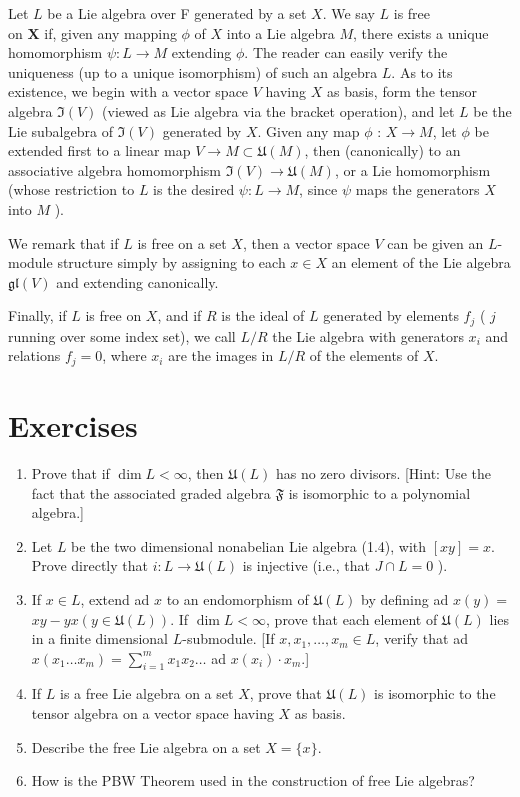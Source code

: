 \documentclass[10pt]{article}
\begin{document}
Let $L$ be a Lie algebra over F generated by a set $X$. We say $L$ is free\\
on $\mathbf{X}$ if, given any mapping $\phi$ of $X$ into a Lie algebra $M$, there exists a unique homomorphism $\psi: L \rightarrow M$ extending $\phi$. The reader can easily verify the uniqueness (up to a unique isomorphism) of such an algebra $L$. As to its existence, we begin with a vector space $V$ having $X$ as basis, form the tensor algebra $\mathfrak{I}(V)$ (viewed as Lie algebra via the bracket operation), and let $L$ be the Lie subalgebra of $\mathfrak{I}(V)$ generated by $X$. Given any map $\phi$ : $X \rightarrow M$, let $\phi$ be extended first to a linear map $V \rightarrow M \subset \mathfrak{U}(M)$, then (canonically) to an associative algebra homomorphism $\mathfrak{I}(V) \rightarrow \mathfrak{U}(M)$, or a Lie homomorphism (whose restriction to $L$ is the desired $\psi: L \rightarrow M$, since $\psi$ maps the generators $X$ into $M$ ).

We remark that if $L$ is free on a set $X$, then a vector space $V$ can be given an $L$-module structure simply by assigning to each $x \in X$ an element of the Lie algebra $\mathfrak{g l}(V)$ and extending canonically.

Finally, if $L$ is free on $X$, and if $R$ is the ideal of $L$ generated by elements $f_{j}$ ( $j$ running over some index set), we call $L / R$ the Lie algebra with generators $x_{i}$ and relations $f_{j}=0$, where $x_{i}$ are the images in $L / R$ of the elements of $X$.

\section*{Exercises}
\begin{enumerate}
  \item Prove that if $\operatorname{dim} L<\infty$, then $\mathfrak{U}(L)$ has no zero divisors. [Hint: Use the fact that the associated graded algebra $\mathfrak{F}$ is isomorphic to a polynomial algebra.]
  \item Let $L$ be the two dimensional nonabelian Lie algebra (1.4), with $[x y]=x$. Prove directly that $i: L \rightarrow \mathfrak{U}(L)$ is injective (i.e., that $J \cap L=0$ ).
  \item If $x \in L$, extend ad $x$ to an endomorphism of $\mathfrak{U}(L)$ by defining ad $x(y)=$ $x y-y x(y \in \mathfrak{U}(L))$. If $\operatorname{dim} L<\infty$, prove that each element of $\mathfrak{U}(L)$ lies in a finite dimensional $L$-submodule. [If $x, x_{1}, \ldots, x_{m} \in L$, verify that ad $x\left(x_{1} \ldots x_{m}\right)=\sum_{i=1}^{m} x_{1} x_{2} \ldots$ ad $x\left(x_{i}\right) \cdot x_{m}$.]
  \item If $L$ is a free Lie algebra on a set $X$, prove that $\mathfrak{U}(L)$ is isomorphic to the tensor algebra on a vector space having $X$ as basis.
  \item Describe the free Lie algebra on a set $X=\{x\}$.
  \item How is the PBW Theorem used in the construction of free Lie algebras?
\end{enumerate}
\end{document}
